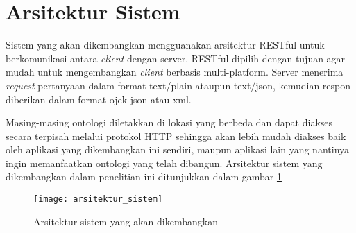 \section{Arsitektur Sistem}
Sistem yang akan dikembangkan mengguanakan arsitektur RESTful untuk berkomunikasi antara \emph{client} dengan server. RESTful dipilih dengan tujuan agar mudah untuk mengembangkan \emph{client} berbasis multi-platform. Server menerima \emph{request} pertanyaan dalam format text/plain ataupun text/json, kemudian respon diberikan dalam format ojek json atau xml.

Masing-masing ontologi diletakkan di lokasi yang berbeda dan dapat diakses secara terpisah melalui protokol HTTP sehingga akan lebih mudah diakses baik oleh aplikasi yang dikembangkan ini sendiri, maupun aplikasi lain yang nantinya ingin memanfaatkan ontologi yang telah dibangun. Arsitektur sistem yang dikembangkan dalam penelitian ini ditunjukkan dalam gambar \ref{fig:arsitektur_sistem}

\begin{figure}[ht]
    \centering
    \texttt{[image: arsitektur\_sistem]}
    \caption{Arsitektur sistem yang akan dikembangkan}
    \label{fig:arsitektur_sistem}
\end{figure}